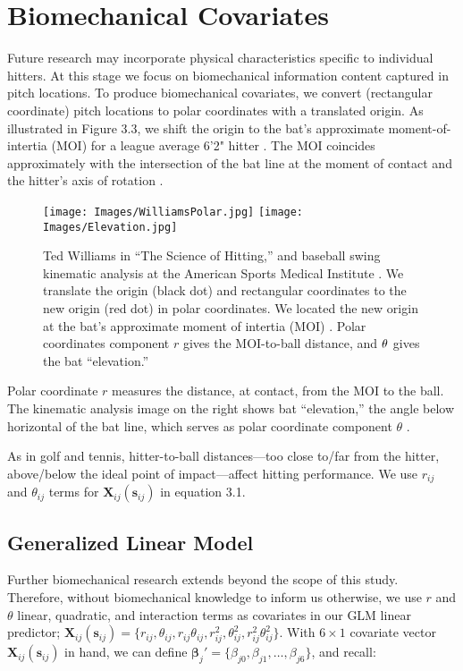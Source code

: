 \section{Biomechanical Covariates}

Future research may incorporate physical characteristics specific to individual hitters. At this stage we focus on biomechanical information content captured in pitch locations. To produce biomechanical covariates, we convert (rectangular coordinate) pitch locations to polar coordinates with a translated origin. As illustrated in Figure 3.3, we shift the origin to the bat's approximate moment-of-intertia (MOI) for a league average 6'2" hitter \citep{Fleisig}. The MOI coincides approximately with the intersection of the bat line at the moment of contact and the hitter's axis of rotation \citep{Welch1995}.
  \begin{figure}[H]
	\centering
	\texttt{[image: Images/WilliamsPolar.jpg]}
	\texttt{[image: Images/Elevation.jpg]}
	\caption{Ted Williams in ``The Science of Hitting,'' and baseball swing kinematic analysis at the American Sports Medical Institute \citep{Fortenbaugh2011}. We translate the origin (black dot) and rectangular coordinates to the new origin (red dot) in polar coordinates. We located the new origin at the bat's approximate moment of intertia (MOI) \citep{Fleisig}. Polar coordinates component $r$ gives the MOI-to-ball distance, and $\protect\theta$ gives the bat ``elevation.''}
	\end{figure}
Polar coordinate $r$ measures the distance, at contact, from the MOI to the ball. The kinematic analysis image on the right shows bat ``elevation,'' the angle below horizontal of the bat line, which serves as polar coordinate component $\theta$ \citep{Fortenbaugh2011}. 

As in golf and tennis, hitter-to-ball distances---too close to/far from the hitter, above/below the ideal point of impact---affect hitting performance. We use $r_{ij}$ and $\theta_{ij}$ terms for $\pmb{X}_{ij}(\pmb{s}_{ij})$ in equation 3.1.

\subsection{Generalized Linear Model} %

Further biomechanical research extends beyond the scope of this study. Therefore, without biomechanical knowledge to inform us otherwise, we use $r$ and $\theta$ linear, quadratic, and interaction terms as covariates in our GLM linear predictor; $\pmb{X}_{ij}(\pmb{s}_{ij}) = \{r_{ij}, \theta_{ij}, r_{ij}\theta_{ij}, r_{ij}^{2}, \theta_{ij}^{2}, r_{ij}^{2}\theta_{ij}^{2}\}$. With $6 \times 1$ covariate vector $\pmb{X}_{ij}(\pmb{s}_{ij})$ in hand, we can define $\pmb{\beta}_{j}' =  \{\beta_{j0}, \beta_{j1}, \dots, \beta_{j6}\}$, and recall:

